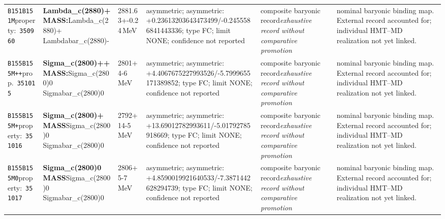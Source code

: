 \begin{landscape}
\begin{longtable}{L{1.85cm}L{4.45cm}L{2.35cm}L{4.05cm}L{3.35cm}L{7.15cm}}
\texttt{B151}\newline \texttt{B151M}\newline property:\ \texttt{350960} & \textbf{Lambda\_\allowbreak{}c(2880)+ MASS:}\newline Lambda\_\allowbreak{}c(2880)+ \textbar{}\allowbreak{} Lambdabar\_\allowbreak{}c(2880)- & 2881.63+-0.24\,MeV & asymmetric; asymmetric: +0.23613203643473499/-0.2455586841443336; type FC; limit NONE; confidence not reported & composite baryonic record\newline \emph{exhaustive record without comparative promotion} & nominal baryonic binding map. External record accounted for; individual HMT--MD realization not yet linked. \\
\texttt{B155}\newline \texttt{B155M++}\newline prop.\ \texttt{351015} & \textbf{Sigma\_\allowbreak{}c(2800)++ MASS:}\newline Sigma\_\allowbreak{}c(2800)0 \textbar{}\allowbreak{} Sigmabar\_\allowbreak{}c(2800)0 & 2801+4-6\,MeV & asymmetric; asymmetric: +4.4067675227993526/-5.7999655171389852; type FC; limit NONE; confidence not reported & composite baryonic record\newline \emph{exhaustive record without comparative promotion} & nominal baryonic binding map. External record accounted for; individual HMT--MD realization not yet linked. \\
\texttt{B155}\newline \texttt{B155M+}\newline property:\ \texttt{351016} & \textbf{Sigma\_\allowbreak{}c(2800)+ MASS}\newline Sigma\_\allowbreak{}c(2800)0 \textbar{}\allowbreak{} Sigmabar\_\allowbreak{}c(2800)0 & 2792+14-5\,MeV & asymmetric; asymmetric: +13.69012782993611/-5.01792785918669; type FC; limit NONE; confidence not reported & composite baryonic record\newline \emph{exhaustive record without comparative promotion} & nominal baryonic binding map. External record accounted for; individual HMT--MD realization not yet linked. \\
\texttt{B155}\newline \texttt{B155M0}\newline property:\ \texttt{351017} & \textbf{Sigma\_\allowbreak{}c(2800)0 MASS}\newline Sigma\_\allowbreak{}c(2800)0 \textbar{}\allowbreak{} Sigmabar\_\allowbreak{}c(2800)0 & 2806+5-7\,MeV & asymmetric; asymmetric: +4.8590019921640533/-7.3871442628294739; type FC; limit NONE; confidence not reported & composite baryonic record\newline \emph{exhaustive record without comparative promotion} & nominal baryonic binding map. External record accounted for; individual HMT--MD realization not yet linked. \\

\end{longtable}
\end{landscape}
